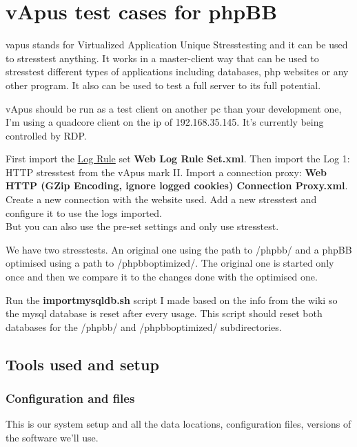 \section{vApus test cases for phpBB}\label{sec:testcasesphpBB}
\gls{vapus} stands for Virtualized Application Unique Stresstesting and it can be used to stresstest anything. It works in a master-client way that can be used to stresstest different types of applications including databases, php websites or any other program. It also can be used to test a full server to its full potential.

vApus should be run as a test client on another pc than your development one, I'm using a quadcore client on the ip of 192.168.35.145. It's currently being controlled by RDP.

First import the \underline{Log Rule} set \textbf{Web Log Rule Set.xml}. Then import the Log 1: HTTP stresstest from the vApus mark II. Import a connection proxy: \textbf{Web HTTP (GZip Encoding, ignore logged cookies) Connection Proxy.xml}. Create a new connection with the website used. Add a new stresstest and configure it to use the logs imported.
\\But you can also use the pre-set settings and only use stresstest.

We have two stresstests. An original one using the path to /phpbb/ and a phpBB optimised using a path to /phpbboptimized/. The original one is started only once and then we compare it to the changes done with the optimised one.

Run the \textbf{importmysqldb.sh} script I made based on the info from the wiki so the \gls{mysql} database is reset after every usage. This script should reset both databases for the /phpbb/ and /phpbboptimized/ subdirectories. 

\subsection{Tools used and setup}
\subsubsection{Configuration and files}
This is our system setup and all the data locations, configuration files, versions of the software we'll use.

